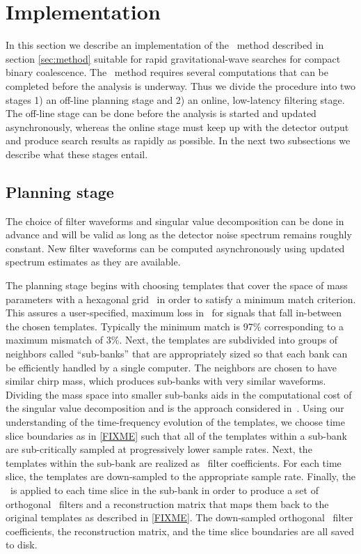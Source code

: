 \section{Implementation}
\label{sec:implementation}

In this section we describe an implementation of the \lloid\ method described
in section \ref{sec:method} suitable for rapid gravitational-wave
searches for compact binary coalescence.  The \lloid\ method requires several
computations that can be completed before the analysis is underway.  Thus
we divide the procedure into two stages 1) an off-line planning stage and 2) an
online, low-latency filtering stage.  The off-line stage can be done before the
analysis is started and updated asynchronously, whereas the online stage must
keep up with the detector output and produce search results as rapidly as
possible.  In the next two subsections we describe what these stages entail.

\subsection{Planning stage}

The choice of filter waveforms and singular value decomposition can be done in
advance and will be valid as long as the detector noise spectrum remains
roughly constant.  New filter waveforms can be computed asynchronously using
updated spectrum estimates as they are available. 

The planning stage begins with choosing templates that cover the space of mass
parameters with a hexagonal grid~\cite{PhysRevD.76.102004} in order to satisfy
a minimum match criterion.  This assures a user-specified, maximum loss in \SNR\
for signals that fall in-between the chosen templates.  Typically the minimum
match is 97\% corresponding to a maximum mismatch of 3\%.  Next, the templates
are subdivided into groups of neighbors called ``sub-banks'' that are
appropriately sized so that each bank can be efficiently handled by a single
computer.  The neighbors are chosen to have similar chirp mass, which produces
sub-banks with very similar waveforms.  Dividing the mass space into smaller
sub-banks aids in the computational cost of the singular value decomposition
and is the approach considered in~\cite{Cannon:2010p10398}.  Using our
understanding of the time-frequency evolution of the templates, we choose time
slice boundaries as in \eqref{FIXME} such that all of the templates within a
sub-bank are sub-critically sampled at progressively lower sample rates.  Next,
the templates within the sub-bank are realized as \fir\ filter
coefficients.  For each time slice, the templates are down-sampled to the
appropriate sample rate.  Finally, the \SVD\ is applied to each time
slice in the sub-bank in order to produce a set of orthogonal \fir\
filters and a reconstruction matrix that maps them back to the original
templates as described in \eqref{FIXME}.  The down-sampled orthogonal
\fir\ filter coefficients, the reconstruction matrix, and the time slice
boundaries are all saved to disk.


